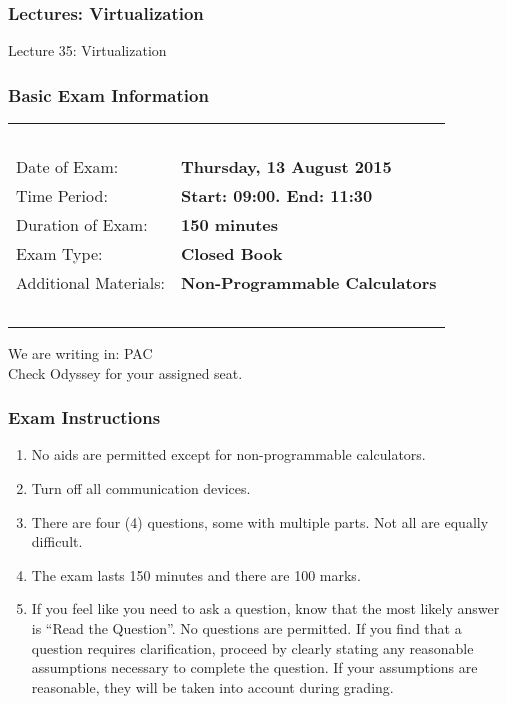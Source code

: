 \begin{frame}
\frametitle{Lectures: Virtualization}

{\LARGE
Lecture 35: Virtualization
}

\end{frame}

\begin{frame}
\frametitle{Basic Exam Information}

\begin{table}[h]
 \begin{tabular}{|l l|}
        	\hline
			~ & ~ \\	
			Date of Exam: & \textbf{Thursday, 13 August 2015} \\
			Time Period: & \textbf{Start: 09:00. End: 11:30}\\
			Duration of Exam: & \textbf{150 minutes}\\
			Exam Type: & \textbf{Closed Book}\\
			Additional Materials: & \textbf{Non-Programmable Calculators}\\
			~ & ~\\
			\hline
          \end{tabular}
\end{table}

We are writing in: PAC\\
Check Odyssey for your assigned seat.

\end{frame}

\begin{frame}
\frametitle{Exam Instructions}

\begin{enumerate}
	\item No aids are permitted except for non-programmable calculators.
	\item Turn off all communication devices.
	\item There are four (4) questions, some with multiple parts. Not all are equally difficult.
	\item The exam lasts 150 minutes and there are 100 marks.
	\item If you feel like you need to ask a question, know that the most likely answer is ``Read the Question''. No questions are permitted. If you find that a question requires clarification, proceed by clearly stating any reasonable assumptions necessary to complete the question. If your assumptions are reasonable, they will be taken into account during grading. 
\end{enumerate}

\end{frame}

